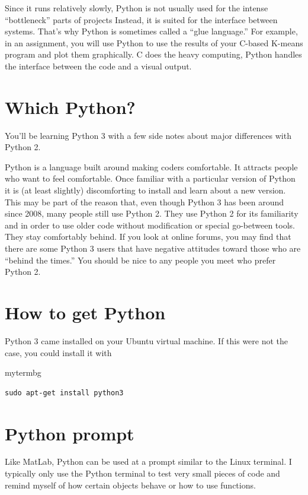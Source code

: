 Since it runs relatively slowly, Python is not usually used for the intense ``bottleneck'' parts of projects
Instead, it is suited for the interface between systems.
That's why Python is sometimes called a ``glue language.''
For example, in an assignment, you will use Python to use the results of your C-based K-means program and plot them graphically.
C does the heavy computing, Python handles the interface between the code and a visual output.

\section{Which Python?}

You'll be learning Python 3 with a few side notes about major differences with Python 2.

Python is a language built around making coders comfortable.
It attracts people who want to feel comfortable.
Once familiar with a particular version of Python it is (at least slightly) discomforting to install and learn about a new version.
This may be part of the reason that,
even though Python 3 has been around since 2008,
many people still use Python 2.
They use Python 2 for its familiarity
and in order to use older code without modification or special go-between tools.
They stay comfortably behind.
If you look at online forums, you may find that there are some Python 3 users that have negative attitudes toward those who are ``behind the times.''
You should be nice to any people you meet who prefer Python 2.

\section{How to get Python}

Python 3 came installed on your Ubuntu virtual machine.
If this were not the case, you could install it with
\begin{tsession}{mytermbg}
\begin{verbatim}
sudo apt-get install python3
\end{verbatim}
\end{tsession}

\section{Python prompt}
Like MatLab, Python can be used at a prompt similar to the Linux terminal.
I typically only use the Python terminal to test very small pieces of code
and remind myself of how certain objects behave or how to use functions.

